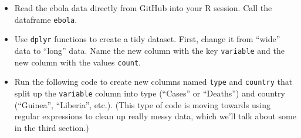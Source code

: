 \documentclass[]{book}
\makeatletter
\newenvironment{Shaded}{\begin{snugshade}}{\end{snugshade}}
\newcommand{\KeywordTok}[1]{\textcolor[rgb]{0.13,0.29,0.53}{\textbf{#1}}}
\newcommand{\DataTypeTok}[1]{\textcolor[rgb]{0.13,0.29,0.53}{#1}}
\newcommand{\DecValTok}[1]{\textcolor[rgb]{0.00,0.00,0.81}{#1}}
\newcommand{\StringTok}[1]{\textcolor[rgb]{0.31,0.60,0.02}{#1}}
\newcommand{\OtherTok}[1]{\textcolor[rgb]{0.56,0.35,0.01}{#1}}
\newcommand{\OperatorTok}[1]{\textcolor[rgb]{0.81,0.36,0.00}{\textbf{#1}}}
\newcommand{\NormalTok}[1]{#1}
\providecommand{\tightlist}{%
  \setlength{\itemsep}{0pt}\setlength{\parskip}{0pt}}
\newenvironment{kframe}{%
\medskip{}
\setlength{\fboxsep}{.8em}
 \def\at@end@of@kframe{}%
 \ifinner\ifhmode%
  \def\at@end@of@kframe{\end{minipage}}%
  \begin{minipage}{\columnwidth}%
 \fi\fi%
 \def\FrameCommand##1{\hskip\@totalleftmargin \hskip-\fboxsep
 \colorbox{shadecolor}{##1}\hskip-\fboxsep
     \hskip-\linewidth \hskip-\@totalleftmargin \hskip\columnwidth}%
 \MakeFramed {\advance\hsize-\width
   \@totalleftmargin\z@ \linewidth\hsize
   \@setminipage}}%
 {\par\unskip\endMakeFramed%
 \at@end@of@kframe}
\renewenvironment{Shaded}{\begin{kframe}}{\end{kframe}}
\theoremstyle{definition}
\theoremstyle{definition}
\theoremstyle{definition}
\theoremstyle{remark}
\makeatother
\begin{document}
\begin{itemize}
\tightlist
\item
  Read the ebola data directly from GitHub into your R session. Call the
  dataframe \texttt{ebola}.
\item
  Use \texttt{dplyr} functions to create a tidy dataset. First, change
  it from ``wide'' data to ``long'' data. Name the new column with the
  key \texttt{variable} and the new column with the values
  \texttt{count}.
\item
  Run the following code to create new columns named \texttt{type} and
  \texttt{country} that split up the \texttt{variable} column into type
  (``Cases'' or ``Deaths'') and country (``Guinea'', ``Liberia'', etc.).
  (This type of code is moving towards using regular expressions to
  clean up really messy data, which we'll talk about some in the third
  section.)
\end{itemize}

\begin{Shaded}
\end{Shaded}
\end{document}
